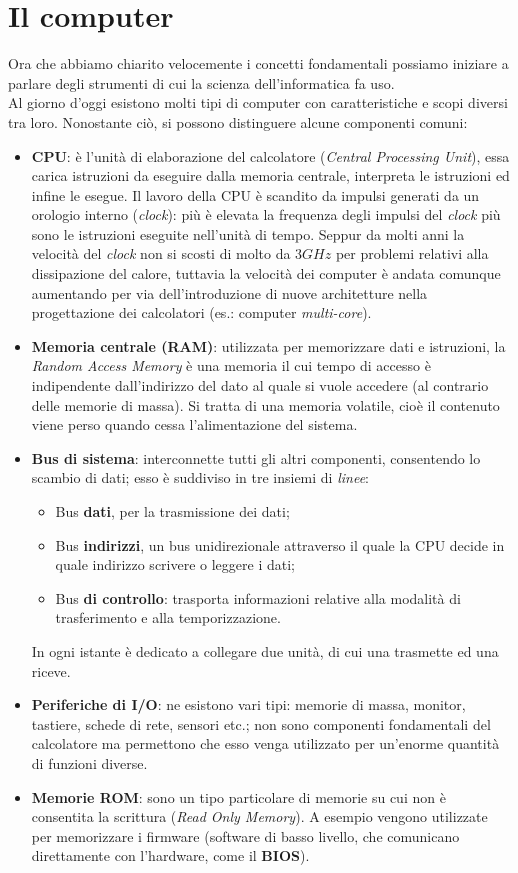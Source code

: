 \section{Il computer}
Ora che abbiamo chiarito velocemente i concetti fondamentali possiamo iniziare a parlare degli strumenti di cui la scienza dell'informatica fa uso. \\
Al giorno d'oggi esistono molti tipi di computer con caratteristiche e scopi diversi tra loro. Nonostante ciò, si possono distinguere alcune componenti comuni:
\begin{itemize}
	\item\textbf{CPU}: è l’unità di elaborazione del calcolatore (\textit{Central Processing Unit}), essa carica istruzioni da eseguire dalla memoria centrale, interpreta le istruzioni ed infine le esegue.
	Il lavoro della CPU è scandito da impulsi generati da un orologio interno (\textit{clock}): più è elevata la frequenza degli impulsi del \textit{clock} più sono le istruzioni eseguite nell’unità di tempo. Seppur da molti anni la velocità del \textit{clock} non si scosti di molto da $3\unit{GHz}$ per problemi relativi alla dissipazione del calore, tuttavia la velocità dei computer è andata comunque aumentando per via dell'introduzione di nuove architetture nella progettazione dei calcolatori (es.: computer \textit{multi-core}).
	\item\textbf{Memoria centrale (RAM)}: utilizzata per memorizzare dati e istruzioni, la \textit{Random Access Memory} è una memoria il cui tempo di accesso è indipendente dall’indirizzo del dato al quale si vuole accedere (al contrario delle memorie di massa). Si tratta di una memoria volatile, cioè il contenuto viene perso quando cessa l’alimentazione del sistema.
	\item\textbf{Bus di sistema}: interconnette tutti gli altri componenti, consentendo lo scambio di dati; esso è suddiviso in tre insiemi di \textit{linee}: 
	\begin{itemize}[noitemsep, nolistsep]
		\item Bus \textbf{dati}, per la trasmissione dei dati; 
		\item Bus \textbf{indirizzi}, un bus unidirezionale attraverso il quale la CPU decide in quale indirizzo scrivere o leggere i dati;
		\item Bus \textbf{di controllo}: trasporta informazioni relative alla modalità di trasferimento e alla temporizzazione.
	\end{itemize}
	In ogni istante è dedicato a collegare due unità, di cui una trasmette ed una riceve.
	\item\textbf{Periferiche di I/O}: ne esistono vari tipi: memorie di massa, monitor, tastiere, schede di rete, sensori etc.; non sono componenti fondamentali del calcolatore  ma permettono che esso venga utilizzato per un'enorme quantità di funzioni diverse.
	\item\textbf{Memorie ROM}: sono un tipo particolare di memorie su cui non è consentita la scrittura (\textit{Read Only Memory}). A esempio vengono utilizzate per memorizzare i firmware (software di basso livello, che comunicano direttamente con l'hardware, come il \textbf{BIOS}).
	
\end{itemize}

